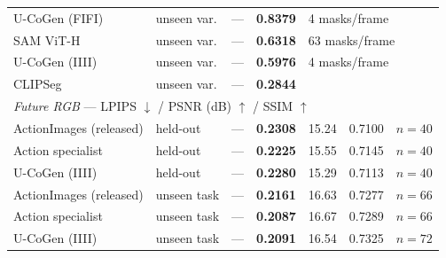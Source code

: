 \begin{table}[h]
\begin{tabular}{llcrrrr}
U-CoGen (FIFI) & unseen var. & --- & \textbf{0.8379} & \multicolumn{3}{l}{4 masks/frame} \\
SAM ViT-H \citep{kirillov2023sam} & unseen var. & --- & \textbf{0.6318} & \multicolumn{3}{l}{63 masks/frame} \\
U-CoGen (IIII) & unseen var. & --- & \textbf{0.5976} & \multicolumn{3}{l}{4 masks/frame} \\
CLIPSeg \citep{luddecke2022clipseg} & unseen var. & --- & \textbf{0.2844} & \multicolumn{3}{l}{} \\
\midrule
\multicolumn{7}{l}{\emph{Future RGB} --- LPIPS $\downarrow$ / PSNR (dB) $\uparrow$ / SSIM $\uparrow$} \\
ActionImages (released) & held-out & --- & \textbf{0.2308} & 15.24 & 0.7100 & $n{=}40$ \\
Action specialist & held-out & --- & \textbf{0.2225} & 15.55 & 0.7145 & $n{=}40$ \\
U-CoGen (IIII) & held-out & --- & \textbf{0.2280} & 15.29 & 0.7113 & $n{=}40$ \\
ActionImages (released) & unseen task & --- & \textbf{0.2161} & 16.63 & 0.7277 & $n{=}66$ \\
Action specialist & unseen task & --- & \textbf{0.2087} & 16.67 & 0.7289 & $n{=}66$ \\
U-CoGen (IIII) & unseen task & --- & \textbf{0.2091} & 16.54 & 0.7325 & $n{=}72$ \\
\bottomrule
\end{tabular}
\end{table}
